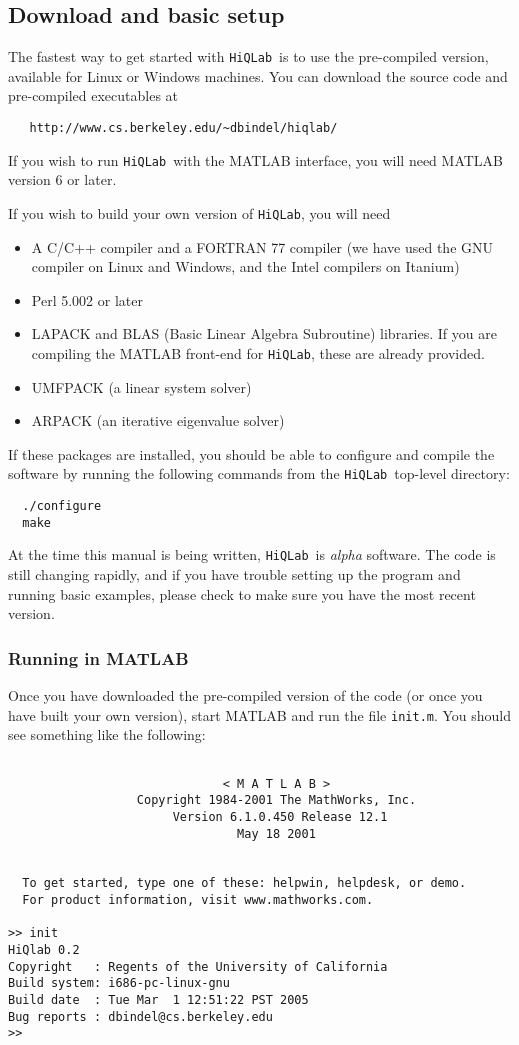 \documentclass{article}
\newcommand{\hiq}{\texttt{HiQLab}}
\newcommand{\ttt}[1]{\texttt{#1}}
\begin{document}
\subsection{Download and basic setup}

The fastest way to get started with \hiq\ is to use the pre-compiled
version, available for Linux or Windows machines.  You can download
the source code and pre-compiled executables at
\begin{verbatim}
   http://www.cs.berkeley.edu/~dbindel/hiqlab/
\end{verbatim}
If you wish to run \hiq\ with the MATLAB interface, you will need
MATLAB version 6 or later.

If you wish to build your own version of \hiq, you will need
\begin{itemize}
  \item A C/C++ compiler and a FORTRAN 77 compiler (we have used the
    GNU compiler on Linux and Windows, and the Intel compilers on
    Itanium)
  \item Perl 5.002 or later
  \item LAPACK and BLAS (Basic Linear Algebra Subroutine) libraries.
    If you are compiling the MATLAB front-end for \hiq, these are
    already provided.
  \item UMFPACK (a linear system solver)
  \item ARPACK (an iterative eigenvalue solver)
\end{itemize}
If these packages are installed, you should be able to configure and
compile the software by running the following commands from the \hiq\
top-level directory:
\begin{verbatim}
  ./configure
  make
\end{verbatim}

At the time this manual is being written, \hiq\ is \emph{alpha}
software.  The code is still changing rapidly, and if you have trouble
setting up the program and running basic examples, please check to
make sure you have the most recent version.


\subsubsection{Running in MATLAB}

Once you have downloaded the pre-compiled version of the code (or once
you have built your own version), start MATLAB and run the file
\ttt{init.m}.  You should see something like the following:
\begin{verbatim}
 
                              < M A T L A B >
                  Copyright 1984-2001 The MathWorks, Inc.
                       Version 6.1.0.450 Release 12.1
                                May 18 2001
 
  
  To get started, type one of these: helpwin, helpdesk, or demo.
  For product information, visit www.mathworks.com.
  
>> init
HiQlab 0.2
Copyright   : Regents of the University of California
Build system: i686-pc-linux-gnu
Build date  : Tue Mar  1 12:51:22 PST 2005
Bug reports : dbindel@cs.berkeley.edu
>>
\end{verbatim}
\end{document}
